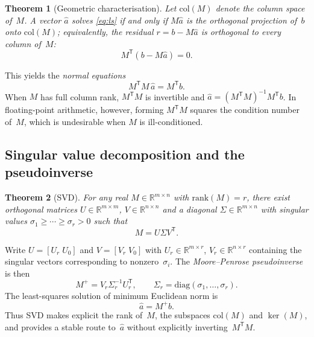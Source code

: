 \documentclass[11pt,a4paper]{article}
\newtheorem{theorem}{Theorem}
\begin{document}
\begin{theorem}[Geometric characterisation]
Let $\mathrm{col}(M)$ denote the column space of~$M$. A vector $\hat{a}$ solves
\eqref{eq:ls} if and only if $M\hat{a}$ is the orthogonal projection of~$b$ onto
$\mathrm{col}(M)$; equivalently, the residual $r = b - M\hat{a}$ is orthogonal to
every column of~$M$:
\begin{equation}
  M^{\mathsf T}(b - M\hat{a}) = 0.
\end{equation}
\end{theorem}

\noindent
This yields the \emph{normal equations}
\begin{equation}
  M^{\mathsf T}M\,\hat{a} = M^{\mathsf T}b.
  \label{eq:normal}
\end{equation}
When $M$ has full column rank, $M^{\mathsf T}M$ is invertible and
$\hat{a} = (M^{\mathsf T}M)^{-1}M^{\mathsf T}b$. In floating-point arithmetic,
however, forming $M^{\mathsf T}M$ squares the condition number of~$M$, which is
undesirable when $M$ is ill-conditioned.

\subsection{Singular value decomposition and the pseudoinverse}

\begin{theorem}[SVD]
For any real $M \in \mathbb{R}^{m \times n}$ with $\mathrm{rank}(M)=r$, there exist
orthogonal matrices $U \in \mathbb{R}^{m \times m}$,
$V \in \mathbb{R}^{n \times n}$ and a diagonal
$\Sigma \in \mathbb{R}^{m \times n}$ with singular values
$\sigma_1 \ge \cdots \ge \sigma_r > 0$ such that
\begin{equation}
  M = U \Sigma V^{\mathsf T}.
\end{equation}
\end{theorem}

\noindent
Write $U = [U_r \; U_0]$ and $V = [V_r \; V_0]$ with
$U_r \in \mathbb{R}^{m \times r}$, $V_r \in \mathbb{R}^{n \times r}$ containing the
singular vectors corresponding to nonzero~$\sigma_i$. The
\emph{Moore--Penrose pseudoinverse} is then
\begin{equation}
  M^{+} = V_r \Sigma_r^{-1} U_r^{\mathsf T},
  \qquad
  \Sigma_r = \mathrm{diag}(\sigma_1,\ldots,\sigma_r).
\end{equation}
The least-squares solution of minimum Euclidean norm is
\begin{equation}
  \hat{a} = M^{+} b.
  \label{eq:pinv-ls}
\end{equation}
Thus SVD makes explicit the rank of~$M$, the subspaces $\mathrm{col}(M)$ and
$\ker(M)$, and provides a stable route to~$\hat{a}$ without explicitly
inverting~$M^{\mathsf T}M$.
\end{document}

